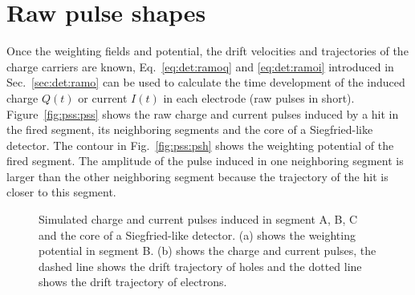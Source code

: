 \section{Raw pulse shapes}
\label{sec:pss:ps}
Once the weighting fields and potential, the drift velocities and trajectories of the charge carriers are known, Eq.~\ref{eq:det:ramoq} and \ref{eq:det:ramoi} introduced in Sec.~\ref{sec:det:ramo} can be used to calculate the time development of the induced charge $Q(t)$ or current $I(t)$ in each electrode (raw pulses in short). Figure~\ref{fig:pss:pss} shows the raw charge and current pulses induced by a hit in the fired segment, its neighboring segments and the core of a Siegfried-like detector. The contour in Fig.~\ref{fig:pss:psh} shows the weighting potential of the fired segment. The amplitude of the pulse induced in one neighboring segment is larger than the other neighboring segment because the trajectory of the hit is closer to this segment.
\begin{figure}[htbp]
\centering
{}%
%
\caption{Simulated charge and current pulses induced in segment A, B, C and the core of a Siegfried-like detector. (a) shows the weighting potential in segment B. (b) shows the charge and current pulses, the dashed line shows the drift trajectory of holes and the dotted line shows the drift trajectory of electrons.}
\label{fig:pss:ps}
\end{figure}


